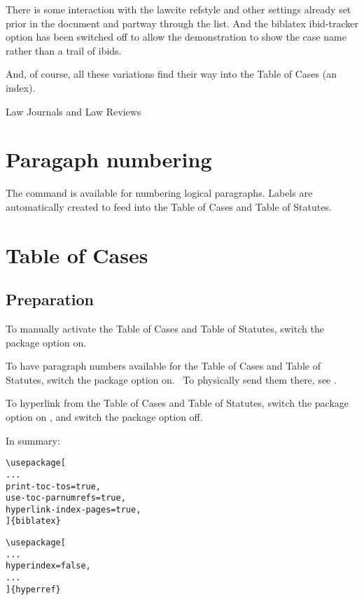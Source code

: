 \newpage
{}
{}
\normalparskip
\bigskip

\p There is some interaction with the lawcite refstyle and other settings already set prior in the document and partway through the list. And the biblatex ibid-tracker option has been switched off to  allow the demonstration to show the case name rather than a trail of ibids.

\p And, of course, all these variations find their way into the Table of Cases (an index).

\newpage
\p Law Journals and Law Reviews
\bigskip

{}
\normalparskip
\bigskip 

\section{Paragaph numbering}
\p The  command is available for numbering logical paragraphs. Labels are automatically created to feed into the Table of Cases and Table of Statutes.


\section{Table of Cases}
\subsection{Preparation}
\p To manually activate the Table of Cases and Table of Statutes, switch the  package option  on. \ci

\p To have paragraph numbers available for the Table of Cases and Table of Statutes, switch the  package option  on. \cii\  To physically send them there, see .

\p To hyperlink from the Table of Cases and Table of Statutes, switch the  package option  on \ciii, and switch the  package option  off. \civ

\p In summary:


\begin{alltt}
\textbackslash{}usepackage[
...
	print-toc-tos=true,   \ci
	use-toc-parnumrefs=true,   \cii
	hyperlink-index-pages=true,   \ciii
]\{biblatex\}

\textbackslash{}usepackage[
...
	hyperindex=false,   \civ
...
]\{hyperref\}
\end{alltt}

